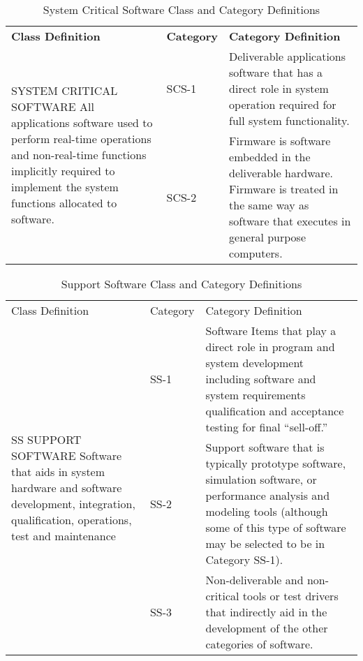 \documentclass{book}
\begin{document}
\setcounter{table}{7}
\begin{table}
	\caption{System Critical Software Class and Category Definitions}
	\begin{tabular}[m]{|l|l|l|}
		\hline
		\textbf{Class Definition} & \textbf{Category} & \textbf{Category Definition} \\ 
		\multirow{2}{*}{SYSTEM CRITICAL SOFTWARE All applications software used to perform real-time operations and non-real-time functions implicitly required to implement the system functions allocated to software.} 
		& SCS-1 
		& Deliverable applications software that has a direct role in system operation required for full system functionality. \\
		& SCS-2 
		& Firmware is software embedded in the deliverable hardware. Firmware is treated in the same way as software that executes in general purpose computers. \\
	\end{tabular}
\end{table}

\begin{table}
	\caption{Support Software Class and Category Definitions}
	\begin{tabular}[m]{|l|l|l|}
		Class Definition & Category & Category Definition\\
		\multirow{3}{*}{SS
			SUPPORT SOFTWARE
			Software that aids in system hardware and
			software development, integration,
			qualification, operations, test and maintenance}
		& SS-1
		& Software Items that play a direct role in program and
		system development including software and system
		requirements qualification and acceptance testing for
		final “sell-off.” \\
		& SS-2
		& Support software that is typically prototype software,
		simulation software, or performance analysis and
		modeling tools (although some of this type of
		software may be selected to be in Category SS-1).\\
		& SS-3
		& Non-deliverable and non-critical tools or test drivers
		that indirectly aid in the development of the other
		categories of software. \\
	\end{tabular}
\end{table}
\end{document}
